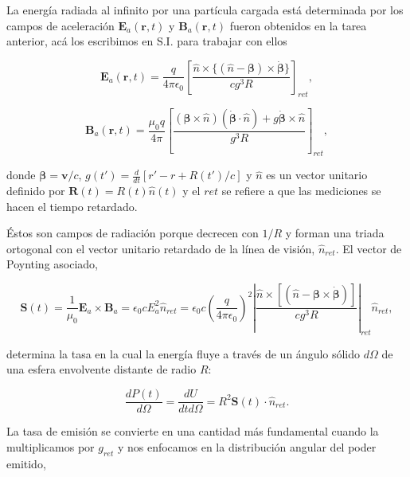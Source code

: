 \documentclass[a4paper,11pt]{article}
\numberwithin{equation}{section}
\begin{document}
\vspace{.3cm}

La energía radiada al infinito por una partícula cargada está determinada por 
los campos de aceleración $\mathbf{E}_a(\mathbf{r},t)$ y $\mathbf{B}_a(\mathbf{r},t)$ 
fueron obtenidos en la tarea anterior, acá los escribimos en S.I. para trabajar con 
ellos 

\begin{equation}
 \mathbf{E}_a(\mathbf{r},t) = \frac{q}{4\pi\epsilon_0}\left[\frac{\hat{n} 
 \times \{(\hat{n} - \pmb{\beta}) \times \dot{\pmb{\beta}} \}}{cg^3R} \right]_{ret},
\end{equation}

\begin{equation}
 \mathbf{B}_a(\mathbf{r},t) = \frac{\mu_0q}{4\pi}\left[\frac{(\pmb{\beta} \times 
 \hat{n})(\dot{\pmb{\beta}} \cdot \hat{n}) + g\dot{\pmb{\beta}} 
 \times \hat{n}}{g^3R} \right]_{ret},
\end{equation}

donde $\pmb{\beta} = \mathbf{v}/c$, $g(t') = \frac{d}{dt}[r' - r + R(t')/c]$ y 
$\hat{n}$ es un vector unitario definido por $\mathbf{R}(t) = R(t)\hat{n}(t)$ y 
el $ret$ se refiere a que las mediciones se hacen el tiempo retardado. 

\vspace{.3cm}

Éstos son campos de radiación porque decrecen con $1/R$ y forman una triada 
ortogonal con el vector unitario retardado de la línea de visión, $\hat{n}_{ret}$. 
El vector de Poynting asociado, 

\begin{equation}
 \mathbf{S}(t) = \frac{1}{\mu_0}\mathbf{E}_a \times \mathbf{B}_a = 
 \epsilon_0cE_{a}^2 \hat{n}_{ret} = \epsilon_0c\left(\frac{q}{4\pi\epsilon_0}\right)^2 
 \left|\frac{\hat{n} \times [(\hat{n} - 
 \pmb{\beta} \times \dot{\pmb{\beta}})]}{cg^3R}\right|_{ret} \hat{n}_{ret}, 
\end{equation}

determina la tasa en la cual la energía fluye a través de un ángulo sólido $d\Omega$ 
de una esfera envolvente distante de radio $R$:

\begin{equation}
 \frac{dP(t)}{d\Omega} = \frac{dU}{dtd\Omega} = R^2 \mathbf{S}(t) \cdot \hat{n}_{ret}.
\end{equation}

La tasa de emisión se convierte en una cantidad más fundamental cuando 
la multiplicamos por $g_{ret}$ y nos enfocamos en la distribución angular del 
poder emitido, 
\end{document}
